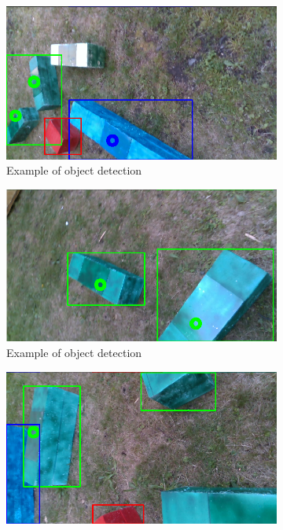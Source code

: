 \documentclass{ctuthesis}
\begin{document}
\begin{figure}[htbp]
     \centering
     \begin{subfigure}{0.475\textwidth}
         \centering
         \includegraphics[width=\textwidth]{Fin_0.png}
         \caption{Example of object detection}
         \label{fig:f1}
     \end{subfigure}
     \hfill
     \begin{subfigure}{0.475\textwidth}
         \centering
         \includegraphics[width=\textwidth]{Fin_1.png}
         \caption{Example of object detection}
         \label{fig:f2}
     \end{subfigure}
          \hfill
     \begin{subfigure}{0.475\textwidth}
         \centering
         \includegraphics[width=\textwidth]{Fin_3.png}

\end{subfigure}
\end{figure}
\end{document}
